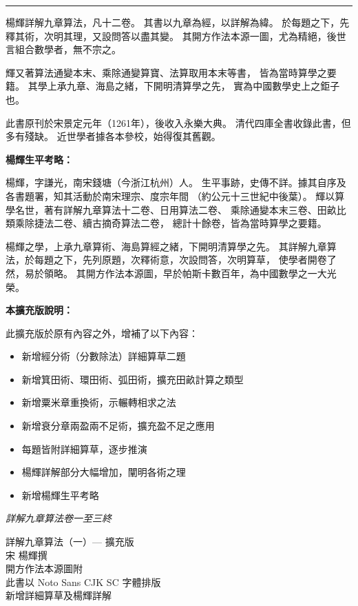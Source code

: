 \documentclass[11pt,a4paper]{article}
\begin{document}
\begin{center}
\rule{0.5\textwidth}{0.4pt}
\end{center}

楊輝詳解九章算法，凡十二卷。
其書以九章為經，以詳解為緯。
於每題之下，先釋其術，次明其理，又設問答以盡其變。
其開方作法本源一圖，尤為精絕，後世言組合數學者，無不宗之。

輝又著算法通變本末、乘除通變算寶、法算取用本末等書，
皆為當時算學之要籍。
其學上承九章、海島之緒，下開明清算學之先，
實為中國數學史上之鉅子也。

此書原刊於宋景定元年（1261年），後收入永樂大典。
清代四庫全書收錄此書，但多有殘缺。
近世學者據各本參校，始得復其舊觀。

\textbf{楊輝生平考略：}

楊輝，字謙光，南宋錢塘（今浙江杭州）人。
生平事跡，史傳不詳。據其自序及各書題署，知其活動於南宋理宗、度宗年間
（約公元十三世紀中後葉）。
輝以算學名世，著有詳解九章算法十二卷、日用算法二卷、
乘除通變本末三卷、田畝比類乘除捷法二卷、續古摘奇算法二卷，
總計十餘卷，皆為當時算學之要籍。

楊輝之學，上承九章算術、海島算經之緒，下開明清算學之先。
其詳解九章算法，於每題之下，先列原題，次釋術意，次設問答，次明算草，
使學者開卷了然，易於領略。
其開方作法本源圖，早於帕斯卡數百年，為中國數學之一大光榮。

\textbf{本擴充版說明：}

此擴充版於原有內容之外，增補了以下內容：
\begin{itemize}[leftmargin=2em]
\item 新增經分術（分數除法）詳細算草二題
\item 新增箕田術、環田術、弧田術，擴充田畝計算之類型
\item 新增粟米章重換術，示輾轉相求之法
\item 新增衰分章兩盈兩不足術，擴充盈不足之應用
\item 每題皆附詳細算草，逐步推演
\item 楊輝詳解部分大幅增加，闡明各術之理
\item 新增楊輝生平考略
\end{itemize}

\begin{flushright}
\textit{詳解九章算法卷一至三終}
\end{flushright}

\vfill

\begin{center}
{\small 詳解九章算法（一）--- 擴充版\\
宋 楊輝撰\\
開方作法本源圖附\\
此書以 Noto Sans CJK SC 字體排版\\
新增詳細算草及楊輝詳解}
\end{center}
\end{document}
